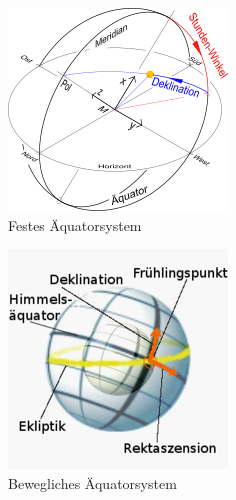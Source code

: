 \documentclass[titlepage]{scrartcl}
\begin{document}
\begin{figure}
        \includegraphics[width=.9\textwidth]{images/FestesAequatorsystem}
\caption{ Festes Äquatorsystem }
\label{fig:Festes Äquatorsystem}
\end{figure}

\begin{figure}
        \includegraphics[width=.9\textwidth]{images/BewegtesAequatorsystem}
\caption{ Bewegliches Äquatorsystem }
\label{fig:Bewegtes Äquatorsystem}
\end{figure}
\end{document}
